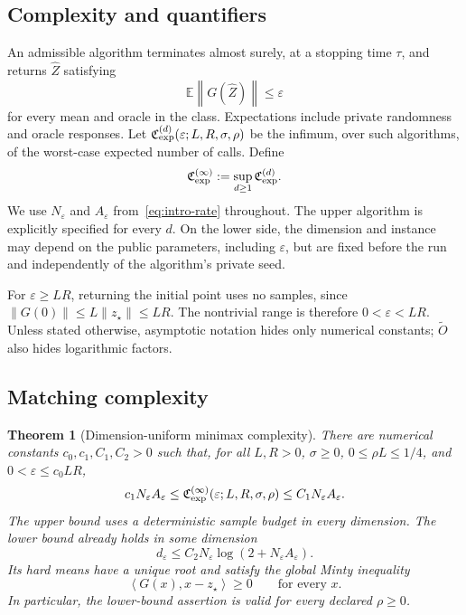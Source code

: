 \documentclass[11pt,a4paper]{article}
\newcommand{\E}{\mathbb E}
\newcommand{\eps}{\varepsilon}
\newcommand{\norm}[1]{\left\lVert #1\right\rVert}
\newcommand{\inner}[2]{\left\langle #1,#2\right\rangle}
\newcommand{\Cexp}{\mathfrak C_{\rm exp}}
\newtheorem{theorem}{Theorem}[section]
\theoremstyle{definition}
\theoremstyle{remark}
\begin{document}
\subsection{Complexity and quantifiers}
An admissible algorithm terminates almost surely, at a stopping time $\tau$,
and returns $\widehat Z$ satisfying
\begin{equation}\label{eq:target}
 \E\norm{G(\widehat Z)}\le\eps
\end{equation}
for every mean and oracle in the class. Expectations include private
randomness and oracle responses. Let
$\Cexp^{(d)}(\eps;L,R,\sigma,\rho)$ be the infimum, over such algorithms,
of the worst-case expected number of calls. Define
\begin{equation}\label{eq:NA}
 \Cexp^{(\infty)}:=\sup_{d\ge1}\Cexp^{(d)}.
\end{equation}
We use $N_\eps$ and $A_\eps$ from~\eqref{eq:intro-rate} throughout.
The upper algorithm is explicitly specified for every $d$. On the lower
side, the dimension and instance may depend on the public parameters,
including $\eps$, but are fixed before the run and independently of the
algorithm's private seed.

For $\eps\ge LR$, returning the initial point uses no samples, since
$\|G(0)\|\le L\|z_\star\|\le LR$. The nontrivial range is therefore
$0<\eps<LR$. Unless stated otherwise, asymptotic notation hides only
numerical constants; $\widetilde O$ also hides logarithmic factors.

\subsection{Matching complexity}
\begin{theorem}[Dimension-uniform minimax complexity]\label{thm:matching}
There are numerical constants $c_0,c_1,C_1,C_2>0$ such that, for all
$L,R>0$, $\sigma\ge0$, $0\le\rho L\le1/4$, and
$0<\eps\le c_0LR$,
\begin{equation}\label{eq:matching}
 c_1N_\eps A_\eps
 \le\Cexp^{(\infty)}(\eps;L,R,\sigma,\rho)
 \le C_1N_\eps A_\eps.
\end{equation}
The upper bound uses a deterministic sample budget in every dimension.
The lower bound already holds in some dimension
\begin{equation}\label{eq:main-dimension}
 d_\eps\le C_2N_\eps\log(2+N_\eps A_\eps).
\end{equation}
Its hard means have a unique root and satisfy the global Minty inequality
\begin{equation}\label{eq:coherent}
 \inner{G(x)}{x-z_\star}\ge0\qquad\text{for every }x.
\end{equation}
In particular, the lower-bound assertion is valid for every declared
$\rho\ge0$.
\end{theorem}
\end{document}
